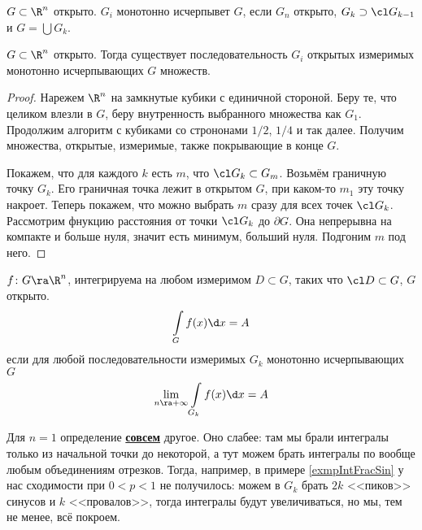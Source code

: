 \begin{Def}
	$G \subset \R^n$ открыто.
	${G_i}$ монотонно исчерпывет $G$, если $G_n$ открыто, $G_k \supset \cl G_{k-1}$ и $G = \bigcup G_k$.
\end{Def}

\begin{theorem}
	$G \subset \R^n$ открыто.
	Тогда существует последовательность $G_i$ открытых измеримых монотонно исчерпывающих $G$ множеств.
\end{theorem}

\begin{proof}
	Нарежем $\R^n$ на замкнутые кубики с единичной стороной.
	Беру те, что целиком влезли в $G$, беру внутренность выбранного множества как $G_1$.
	Продолжим алгоритм с кубиками со стрононами $1/2$, $1/4$ и так далее.
	Получим множества, открытые, измеримые, также покрывающие в конце $G$.

	Покажем, что для каждого $k$ есть $m$, что $\cl G_k \subset G_m$.
	Возьмём граничную точку $G_k$. Его граничная точка лежит в открытом $G$, при каком-то $m_1$ эту точку накроет.
	Теперь покажем, что можно выбрать $m$ сразу для всех точек $\cl G_k$.
	Рассмотрим фнукцию расстояния от точки $\cl G_k$ до $\partial G$.
	Она непрерывна на компакте и больше нуля, значит есть минимум, больший нуля.
	Подгоним $m$ под него.
\end{proof}

\begin{Def}
	$f\colon G \ra \R^n$, интегрируема на любом измеримом $D \subset G$, таких что $\cl D \subset G$, $G$ открыто.
	\[ \int\limits_G f(x) \d x = A \]
	если для любой последовательности измеримых $G_k$ монотонно исчерпывающих $G$
	\[ \lim_{n\ra+\infty} \int\limits_{G_k} f(x) \d x = A \]
\end{Def}
\begin{Rem}
	Для $n = 1$ определение \underline{\bf совсем} другое.
	Оно слабее: там мы брали интегралы только из начальной точки до некоторой, а тут можем брать интегралы по вообще любым объединениям отрезков.
	Тогда, например, в примере \ref{exmpIntFracSin} у нас сходимости при $0<p<1$ не получилось: можем в $G_k$ брать $2k$ <<пиков>> синусов и $k$ <<провалов>>,
	тогда интегралы будут увеличиваться, но мы, тем не менее, всё покроем.
\end{Rem}

